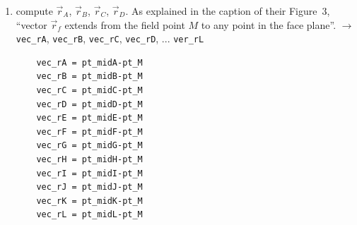 \begin{enumerate}
\begin{eqnarray}
\omega_K &=& 
2 \arctan \frac{\vec{r_{\color{teal}4}} \cdot (\vec{r}_{\color{teal}3} \times \vec{r}_{\color{teal}1})}
{{r}_{\color{teal}4}{r}_{\color{teal}3}{r}_{\color{teal}1} 
+{r}_{\color{teal}3}(\vec{r}_{\color{teal}1}\cdot\vec{r}_{\color{teal}4}) 
+{r}_{\color{teal}1}(\vec{r}_{\color{teal}4}\cdot\vec{r}_{\color{teal}3}) 
+{r}_{\color{teal}4}(\vec{r}_{\color{teal}3}\cdot\vec{r}_{\color{teal}1})  }  
\qquad K=\{{\color{teal}4,3,1}\}=\{ {\color{purple} 7,18,8} \}
\nn\\
\omega_L &=& 
2 \arctan \frac{\vec{r_{\color{teal}2}} \cdot (\vec{r}_{\color{teal}1} \times \vec{r}_{\color{teal}3})}
{{r}_{\color{teal}2}{r}_{\color{teal}1}{r}_{\color{teal}3} 
+{r}_{\color{teal}3}(\vec{r}_{\color{teal}2}\cdot\vec{r}_{\color{teal}1}) 
+{r}_{\color{teal}2}(\vec{r}_{\color{teal}1}\cdot\vec{r}_{\color{teal}3}) 
+{r}_{\color{teal}1}(\vec{r}_{\color{teal}3}\cdot\vec{r}_{\color{teal}2})  }  
\qquad L=\{ {\color{teal}2,1,3}\}=\{ {\color{purple} 5,18,6} \}
\nn
\end{eqnarray}



{\tiny
\begin{lstlisting}
# A: 516
num=np.dot(vec_r05,np.cross(vec_r01,vec_r06))
denom=(r05*r01*r06+r05*np.dot(vec_r01,vec_r06)
      +r01*np.dot(vec_r06,vec_r05)
      +r06*np.dot(vec_r05,vec_r01))
wA=2*np.arctan2(num,denom)

# B: 261
num=np.dot(vec_r02,np.cross(vec_r06,vec_r01))
denom=(r02*r06*r01+r02*np.dot(vec_r06,vec_r01)
      +r06*np.dot(vec_r01,vec_r02)
      +r01*np.dot(vec_r02,vec_r06))
wB=2*np.arctan2(num,denom)

# C: 627
num=np.dot(vec_r06,np.cross(vec_r02,vec_r07))
denom=(r06*r02*r07+r06*np.dot(vec_r02,vec_r07)
      +r02*np.dot(vec_r07,vec_r06)
      +r07*np.dot(vec_r06,vec_r02))
wC=2*np.arctan2(num,denom)

...
\end{lstlisting}
}




\item compute $\vec{r}_{A}$, $\vec{r}_{B}$, $\vec{r}_{C}$, $\vec{r}_{D}$.
As explained in the caption of their Figure~3, ``vector $\vec{r}_f$
extends from the field point $M$ to any point in the face plane''.
$\rightarrow$ \verb|vec_rA|, \verb|vec_rB|, \verb|vec_rC|, \verb|vec_rD|, ... \verb|ver_rL|

{\tiny
\begin{lstlisting}
    vec_rA = pt_midA-pt_M
    vec_rB = pt_midB-pt_M
    vec_rC = pt_midC-pt_M
    vec_rD = pt_midD-pt_M
    vec_rE = pt_midE-pt_M
    vec_rF = pt_midF-pt_M
    vec_rG = pt_midG-pt_M
    vec_rH = pt_midH-pt_M
    vec_rI = pt_midI-pt_M
    vec_rJ = pt_midJ-pt_M
    vec_rK = pt_midK-pt_M
    vec_rL = pt_midL-pt_M
\end{lstlisting}
}





\end{enumerate}
